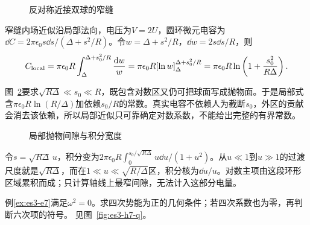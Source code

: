 \begin{figure}[H]\centering
{}
\caption{反对称近接双球的窄缝}\label{fig:es3-h6-q}
\end{figure}
\begin{solution}
窄缝内场近似沿局部法向，电压为$V=2U$，圆环微元电容为$\dd C=2\pi\epsilon_0s\dd s/(\Delta+s^2/R)$。令$w=\Delta+s^2/R$，$\dd w=2s\dd s/R$，则
\[C_{\rm local}=\pi\epsilon_0R\int_\Delta^{\Delta+s_0^2/R}\frac{\mathop{}\!\mathrm d w}w
=\pi\epsilon_0R[\ln w]_\Delta^{\Delta+s_0^2/R}
=\pi\epsilon_0R\ln\left(1+\frac{s_0^2}{R\Delta}\right).\]

图~\ref{fig:es3-h6-s}要求$\sqrt{R\Delta}\ll s_0\ll R$，既包含对数区又仍可把球面写成抛物面。于是局部式含$\pi\epsilon_0R\ln(R/\Delta)$加依赖$s_0/R$的常数。真实电容不依赖人为截断$s_0$，外区的贡献会消去该依赖，所以局部近似只可靠确定对数系数，不能给出完整的有界常数。
\begin{figure}[H]\centering
{}
\caption{局部抛物间隙与积分宽度}\label{fig:es3-h6-s}
\end{figure}


令$s=\sqrt{R\Delta}\,u$，积分变为$2\pi\epsilon_0R\int_0^{s_0/\sqrt{R\Delta}}u\dd u/(1+u^2)$。从$u\ll1$到$u\gg1$的过渡尺度就是$\sqrt{R\Delta}$，而在$1\ll u\ll\sqrt{R/\Delta}$区，积分核为$\dd u/u$。对数主项由这段环形区域累积而成；只计算轴线上最窄间隙，无法计入这部分电量。
\end{solution}

\begin{exercise}[带电摆临界点的四次稳定性]\label{ex:es3-h7}
例\ref{ex:es3-e7}满足$\omega^2=0$。求四次势能为正的几何条件；若四次系数也为零，再判断六次项的符号。 见图~\ref{fig:es3-h7-q}。
\end{exercise}

